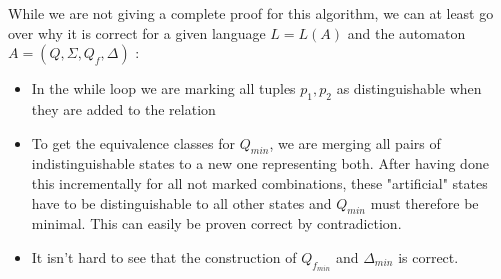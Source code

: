 \documentclass{llncs}
\begin{document}
While we are not giving a complete proof for this algorithm, we can at least go over why it is correct for a given language \(L = L(A)\) and the automaton \(A = (Q, \Sigma, Q_f, \Delta) \) \cite{tata-nfta}:
\begin{itemize}
	\item In the while loop we are marking all tuples \(p_1, p_2\) as distinguishable when they are added to the relation
	\\
	\item To get the equivalence classes for \(Q_{min}\), we are merging all pairs of indistinguishable states to a new one representing both. After having done this incrementally for all not marked combinations, these "artificial" states have to be distinguishable to all other states and \(Q_{min}\) must therefore be minimal. This can easily be proven correct by contradiction.
	\\
	\item It isn't hard to see that the construction of \(Q_{f_{min}}\) and \(\Delta_{min} \) is correct.
\end{itemize}
\end{document}
